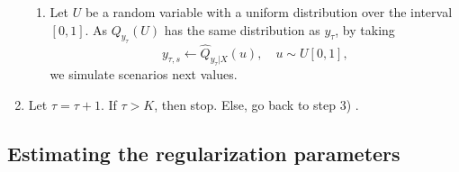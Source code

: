 \begin{algorithm}
\begin{enumerate}
\begin{enumerate}
		
		\item Let $U$ be a random variable with a uniform distribution over the interval $[0,1]$. As $Q_{y_\tau}(U)$ has the same distribution as $y_\tau$, by taking
		$$y_{\tau,s} \leftarrow \hat Q_{y_\tau | X}(u), \quad u \sim U[0,1],$$
		we simulate scenarios next values.



		 \end{enumerate}
	
	
	\item Let $\tau = \tau + 1$. If $\tau > K$, then stop. Else, go back to step 3) . 


\end{enumerate}

\end{algorithm}


\subsection{Estimating the regularization parameters} \label{sec:SIC}



